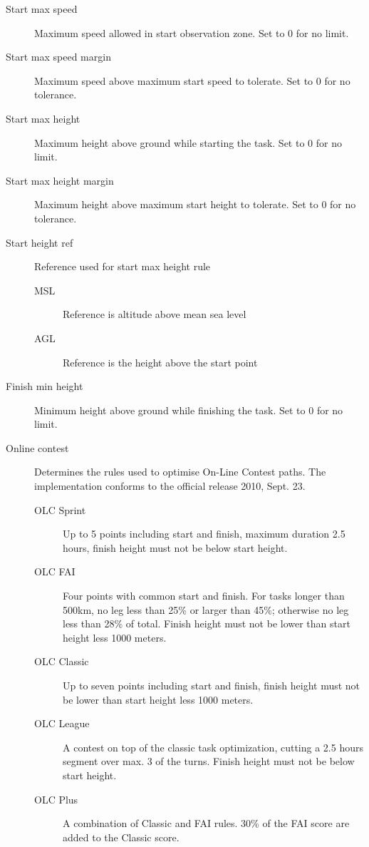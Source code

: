 \documentclass[a4paper,12pt]{refrep}
\begin{document}
\begin{description}
\item[Start max speed]  Maximum speed allowed in start observation zone.  Set to 0 for no limit.
\item[Start max speed margin] Maximum speed above maximum start speed to tolerate.  Set to 0 for no tolerance.
\item[Start max height]  Maximum height above ground while starting the task.  Set to 0 for no limit.
\item[Start max height margin]  Maximum height above maximum start height to tolerate.  Set to 0 for no tolerance.
\item[Start height ref]  Reference used for start max height rule
\begin{description}
\item[MSL] Reference is altitude above mean sea level
\item[AGL] Reference is the height above the start point
\end{description}
\item[Finish min height]  Minimum height above ground while finishing the task.  Set to 0 for no limit. 
\item[Online contest] Determines the rules used to optimise On-Line Contest
paths.  The implementation  conforms to the official release 2010, Sept. 23.
\begin{description}
\item[OLC Sprint]  Up to 5 points including start and finish, maximum duration
2.5 hours, finish height must not be below start height.
\item[OLC FAI]  Four points with common start and finish.  For tasks longer than
500km, no leg less than 25\% or larger than 45\%; otherwise no leg less than 28\% of total.  Finish height must 
not be lower than start height less 1000 meters.
\item[OLC Classic]  Up to seven points including start and finish, finish height
must not be lower than start height less 1000 meters.
\item[OLC League]  A contest on top of the classic task optimization, cutting
a 2.5 hours segment over max. 3 of the turns. Finish height must not be below
start height.
\item[OLC Plus]  A combination of Classic and FAI rules. 30\% of the FAI score
are added to the Classic score.
\end{description}
\end{description}
\end{document}
